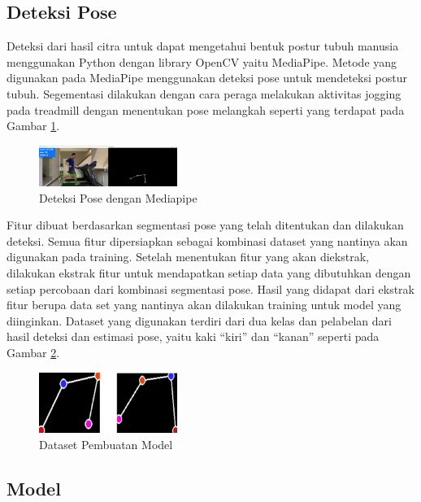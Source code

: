\subsection{Deteksi Pose}
\label{subsec:DeteksiPose}

Deteksi dari hasil citra untuk dapat mengetahui bentuk postur tubuh manusia menggunakan Python dengan library OpenCV yaitu MediaPipe. Metode yang digunakan pada MediaPipe menggunakan deteksi pose untuk mendeteksi postur tubuh. Segementasi dilakukan dengan cara peraga melakukan aktivitas jogging pada treadmill dengan menentukan pose melangkah seperti yang terdapat pada Gambar \ref{fig:DeteksiPose}.

\begin{figure} [ht]
  \centering
  \includegraphics[width=0.4\textwidth]{gambar/deteksi pose.png}
  \caption{Deteksi Pose dengan Mediapipe}
  \label{fig:DeteksiPose}
\end{figure}

Fitur dibuat berdasarkan segmentasi pose yang telah ditentukan dan dilakukan deteksi. Semua fitur dipersiapkan sebagai kombinasi dataset yang nantinya akan digunakan pada training. Setelah menentukan fitur yang akan diekstrak, dilakukan ekstrak fitur untuk mendapatkan setiap data yang dibutuhkan dengan setiap percobaan dari kombinasi segmentasi pose. Hasil yang didapat dari ekstrak fitur berupa data set yang nantinya akan dilakukan training untuk model yang diinginkan. Dataset yang digunakan terdiri dari dua kelas dan pelabelan dari hasil deteksi dan estimasi pose, yaitu kaki “kiri” dan “kanan” seperti pada Gambar \ref{fig:DeteksiPose2}.

\begin{figure} [ht]
  \centering
  \includegraphics[width=0.4\textwidth]{gambar/deteksi pose2.png}
  \caption{Dataset Pembuatan Model}
  \label{fig:DeteksiPose2}
\end{figure}

\subsection{Model}
\label{subsec:Model}

